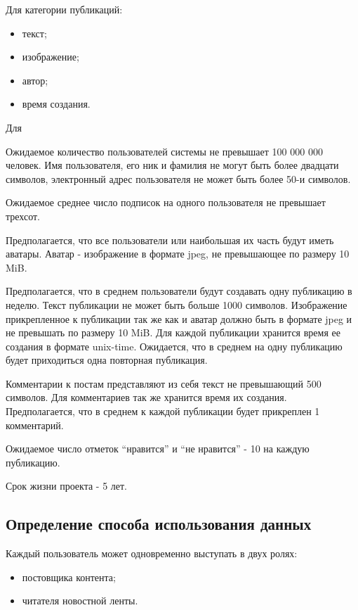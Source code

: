 Для категории публикаций:
\begin{itemize}
\item текст;
\item изображение;
\item автор;
\item время создания.
\end{itemize}

Для 

Ожидаемое количество пользователей системы не превышает 100 000 000 человек.
Имя пользователя, его ник и фамилия не могут быть более двадцати символов, электронный адрес пользователя не может быть более 50-и символов.

Ожидаемое среднее число подписок на одного пользователя не превышает трехсот.

Предполагается, что все пользователи или наибольшая их часть будут иметь аватары.
Аватар - изображение  в формате jpeg, не превышающее по размеру 10 MiB.

Предполагается, что в среднем пользователи будут создавать одну публикацию 
в неделю.
Текст публикации не может быть больше 1000 символов.
Изображение прикрепленное к публикации так же как и аватар 
должно быть в формате jpeg и не превышать по размеру 10 MiB.
Для каждой публикации хранится время ее создания в формате unix-time.
Ожидается, что в среднем на одну публикацию будет приходиться 
одна повторная публикация.

Комментарии к постам представляют из себя текст не превышающий 500 символов.
Для комментариев так же хранится время их создания.
Предполагается, что в среднем к каждой публикации будет прикреплен 1 комментарий.

Ожидаемое число отметок ``нравится'' и ``не нравится'' - 10 на каждую публикацию.



Срок жизни проекта - 5 лет.

\subsection{Определение способа использования данных}

Каждый пользователь может одновременно выступать в двух ролях:
\begin{itemize}
\item постовщика контента;
\item читателя новостной ленты.
\end{itemize}




